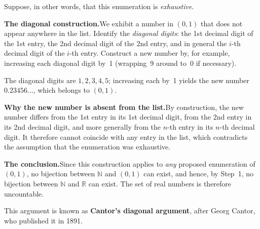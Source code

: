 \documentclass[12pt]{article}
\theoremstyle{definition}
\theoremstyle{plain}
\theoremstyle{remark}
\newcommand{\N}{\mathbb{N}}
\newcommand{\R}{\mathbb{R}}
\begin{document}
\begin{center}
\end{center}

Suppose, in other words, that this enumeration is \emph{exhaustive}.

\medskip
\noindent\textbf{The diagonal construction.}\quad We exhibit a number in $(0,1)$
that does not appear anywhere in the list. Identify the \emph{diagonal digits}:
the 1st decimal digit of the 1st entry, the 2nd decimal digit of the 2nd entry,
and in general the $i$-th decimal digit of the $i$-th entry. Construct a new
number by, for example, increasing each diagonal digit by~1 (wrapping~9 around to~0 if necessary).

\begin{center}
\end{center}

The diagonal digits are $1, 2, 3, 4, 5$; increasing each by~1 yields the new
number $0.23456\ldots$, which belongs to $(0,1)$.

\medskip
\noindent\textbf{Why the new number is absent from the list.}\quad By
construction, the new number differs from the 1st entry in its 1st decimal digit,
from the 2nd entry in its 2nd decimal digit, and more generally from the $n$-th
entry in its $n$-th decimal digit. It therefore cannot coincide with any entry in
the list, which contradicts the assumption that the enumeration was exhaustive.

\medskip
\noindent\textbf{The conclusion.}\quad Since this construction applies to \emph{any}
proposed enumeration of $(0,1)$, no bijection between $\N$ and $(0,1)$ can
exist, and hence, by Step~1, no bijection between $\N$ and $\R$ can exist.
The set of real numbers is therefore uncountable.

\medskip
\noindent This argument is known as \textbf{Cantor's diagonal argument}, after
Georg Cantor, who published it in 1891.
\end{document}
